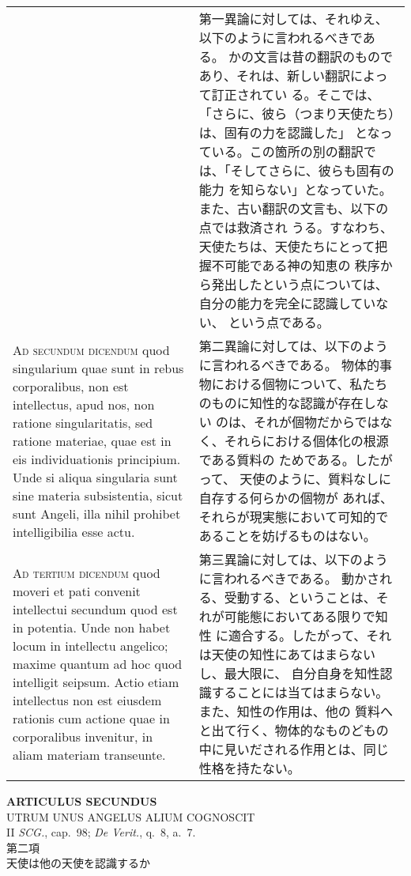 \documentclass[10pt]{jsarticle} %
\begin{document}
\begin{longtable}{p{21em}p{21em}}
&

 第一異論に対しては、それゆえ、以下のように言われるべきである。
 かの文言は昔の翻訳のものであり、それは、新しい翻訳によって訂正されてい
 る。そこでは、「さらに、彼ら（つまり天使たち）は、固有の力を認識した」
 となっている。この箇所の別の翻訳では、「そしてさらに、彼らも固有の能力
 を知らない」となっていた。また、古い翻訳の文言も、以下の点では救済され
 うる。すなわち、天使たちは、天使たちにとって把握不可能である神の知恵の
 秩序から発出したという点については、自分の能力を完全に認識していない、
 という点である。
 

\\


{\scshape Ad secundum dicendum} quod singularium quae
sunt in rebus corporalibus, non est intellectus, apud nos, non ratione
singularitatis, sed ratione materiae, quae est in eis individuationis
principium. Unde si aliqua singularia sunt sine materia subsistentia,
sicut sunt Angeli, illa nihil prohibet intelligibilia esse actu.


&

 第二異論に対しては、以下のように言われるべきである。
 物体的事物における個物について、私たちのものに知性的な認識が存在しない
 のは、それが個物だからではなく、それらにおける個体化の根源である質料の
 ためである。したがって、 天使のように、質料なしに自存する何らかの個物が
 あれば、それらが現実態において可知的であることを妨げるものはない。

\\


{\scshape Ad tertium dicendum} quod moveri et pati
convenit intellectui secundum quod est in potentia. Unde non habet locum
in intellectu angelico; maxime quantum ad hoc quod intelligit
seipsum. Actio etiam intellectus non est eiusdem rationis cum actione
quae in corporalibus invenitur, in aliam materiam transeunte.


&

 第三異論に対しては、以下のように言われるべきである。
 動かされる、受動する、ということは、それが可能態においてある限りで知性
 に適合する。したがって、それは天使の知性にあてはまらないし、最大限に、
 自分自身を知性認識することには当てはまらない。また、知性の作用は、他の
 質料へと出て行く、物体的なものどもの中に見いだされる作用とは、同じ性格を持たない。
 


\end{longtable}
\newpage



\begin{center}
 {\Large {\bf ARTICULUS SECUNDUS}}\\
 {\large UTRUM UNUS ANGELUS ALIUM COGNOSCIT}\\
 {\footnotesize II {\itshape SCG.}, cap.~98; {\itshape De Verit.}, q.~8, a.~7.}\\
 {\Large 第二項\\天使は他の天使を認識するか}
\end{center}
\end{document}
